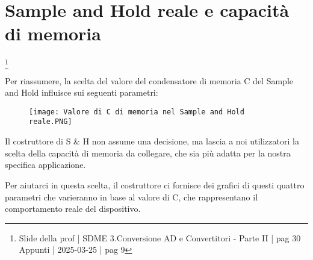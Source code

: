 \newpage

\section{Sample and Hold reale e capacità di memoria}
\footnote{Slide della prof | SDME 3.Conversione AD e Convertitori - Parte II | pag 30 \\  
Appunti | 2025-03-25 | pag 9}

Per riassumere, la scelta del valore del condensatore di memoria C del Sample and Hold influisce sui seguenti parametri: 

\begin{figure}[h]
    \centering
    \texttt{[image: Valore di C di memoria nel Sample and Hold reale.PNG]}
\end{figure}

Il costruttore di S \& H non assume una decisione, ma lascia a noi utilizzatori la scelta della capacità di memoria da collegare, 
che sia più adatta per la nostra specifica applicazione. \newline 

Per aiutarci in questa scelta, il costruttore ci fornisce dei grafici di questi quattro parametri che varieranno in base al valore di C, che rappresentano il comportamento reale del dispositivo. \newline 

\newpage 

